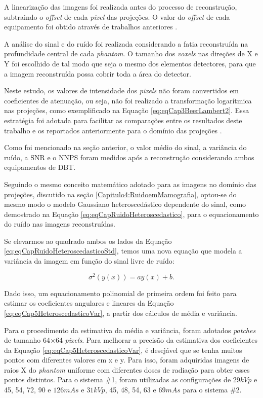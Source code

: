 A linearização das imagens foi realizada antes do processo de reconstrução, subtraindo o \textit{offset} de cada \textit{pixel} das projeções. O valor do \textit{offset} de cada equipamento foi obtido através de trabalhos anteriores \cite{young2008technical,borges2017pipeline, borges2017method}.

A análise do sinal e do ruído foi realizada considerando a fatia reconstruída na profundidade central de cada \textit{phantom}. O tamanho dos \textit{voxels} nas direções de X e Y foi escolhido de tal modo que seja o mesmo dos elementos detectores, para que a imagem reconstruída possa cobrir toda a área do detector. 

Neste estudo, os valores de intensidade dos \textit{pixels} não foram convertidos em coeficientes de atenuação, ou seja, não foi realizado a transformação logarítmica nas projeções, como exemplificado na Equação \ref{eq:eqCap3BeerLambert2}. Essa estratégia foi adotada para facilitar as comparações entre os resultados deste trabalho e os reportados anteriormente para o domínio das projeções \cite{borges2017pipeline,borges2017method, borges2018restoration,brito2018application,guerrero2018}.

Como foi mencionado na seção anterior, o valor médio do sinal, a variância do ruído, a \acs{SNR} e o \acs{NNPS} foram medidos após a reconstrução considerando ambos equipamentos de \acs{DBT}. 

Seguindo o mesmo conceito matemático adotado para as imagens no domínio das projeções, discutido na seção \ref{Capitulo4:RuidoemMamografia}, optou-se do mesmo modo o modelo Gaussiano heteroscedástico dependente do sinal, como demostrado na Equação \ref{eq:eqCapRuidoHeteroscedastico}, para o equacionamento  do ruído nas imagens reconstruídas. 

Se elevarmos ao quadrado ambos os lados da Equação \ref{eq:eqCapRuidoHeteroscedasticoStd}, temos uma nova equação que modela a variância da imagem em função do sinal livre de ruído:

\begin{equation}
\sigma^{2}(y(x)) = ay(x)+b.
\label{eq:eqCap5HeteroscedasticoVar}
\end{equation} 

Dado isso, um equacionamento polinomial de primeira ordem foi feito para estimar os coeficientes angulares e lineares da Equação \ref{eq:eqCap5HeteroscedasticoVar}, a partir dos cálculos de média e variância.

Para o procedimento da estimativa da média e variância, foram adotados \textit{patches} de tamanho 64$\times$64 \textit{pixels}. Para melhorar a precisão da estimativa dos coeficientes da Equação \ref{eq:eqCap5HeteroscedasticoVar}, é desejável que se tenha muitos pontos com diferentes valores em x e y. Para isso, foram adquiridas imagens de raios X do \textit{phantom} uniforme com diferentes doses de radiação para obter esses pontos distintos. Para o sistema \#1, foram utilizadas as configurações de $29kVp$ e 45, 54, 72, 90 e $126mAs$ e $31kVp$, 45, 48, 54, 63 e $69mAs$ para o sistema \#2.


